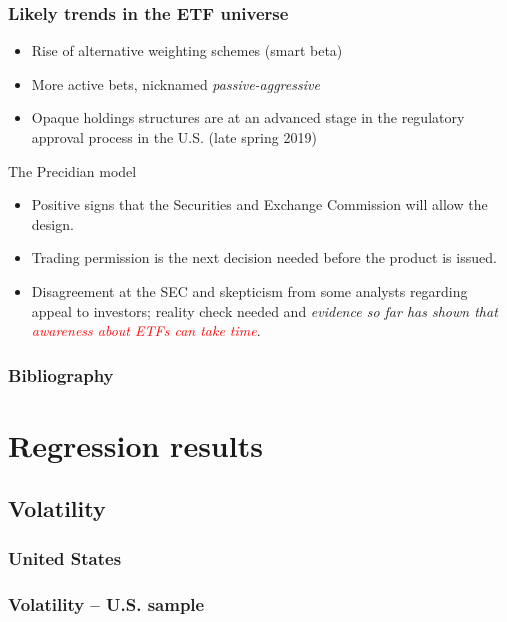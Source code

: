 \documentclass[9pt, usenames, dvipsnames]{beamer}
\begin{document}
\begin{frame}
  \frametitle{Likely trends in the ETF universe}
  \begin{itemize}
  \item Rise of alternative weighting schemes (smart beta)  
  \item More active bets, nicknamed \textit{passive-aggressive}
  \item Opaque holdings structures are at an advanced stage in the regulatory approval process in the U.S. (late spring 2019)
  \end{itemize}
  \begin{block}{The Precidian model}
    \begin{itemize}
    \item Positive signs that the Securities and Exchange Commission will allow the design.
    \item Trading permission is the next decision needed before the product is issued.
    \item Disagreement at the SEC and skepticism from some analysts regarding appeal to investors; reality check needed and \textit{evidence so far has shown that \textcolor{red}{awareness about ETFs can take time}}.
    \end{itemize}
    
  \end{block}
  
\end{frame}


\begin{frame}
  \frametitle{Bibliography}
    \printbibliography
\end{frame}
\appendix
\section{Regression results}
\subsection{Volatility}
\subsubsection{United States}
\begin{frame}[allowframebreaks, t]
  \frametitle{Volatility -- U.S. sample}
  \centering
  
\end{frame}
\end{document}

